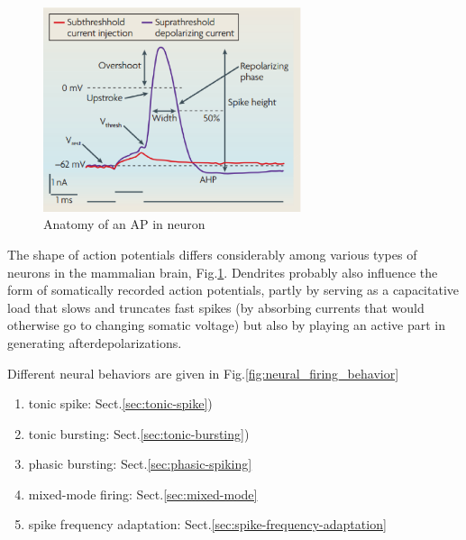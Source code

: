 \begin{figure}[hbt]
 \centerline{\includegraphics[height=6cm]{./images/AP_neuron.eps}}
 \caption{Anatomy of an AP in neuron}
\label{fig:AP_neuron}
\end{figure}

The shape of action potentials differs considerably among various types of
neurons in the mammalian brain, Fig.\ref{fig:AP_neuron}.
Dendrites probably also influence the form of somatically
recorded action potentials, partly by serving as a
capacitative load that slows and truncates fast spikes (by
absorbing currents that would otherwise go to changing
somatic voltage) but also by playing an active part in generating
afterdepolarizations.
 
 
Different neural behaviors are given in Fig.\ref{fig:neural_firing_behavior}
\begin{enumerate}
  \item tonic spike: Sect.\ref{sec:tonic-spike}) 
  
  \item tonic bursting: Sect.\ref{sec:tonic-bursting}) 
  
  \item phasic bursting: Sect.\ref{sec:phasic-spiking}
  
  \item mixed-mode firing: Sect.\ref{sec:mixed-mode}
  
  \item spike frequency adaptation: Sect.\ref{sec:spike-frequency-adaptation}
\end{enumerate}

